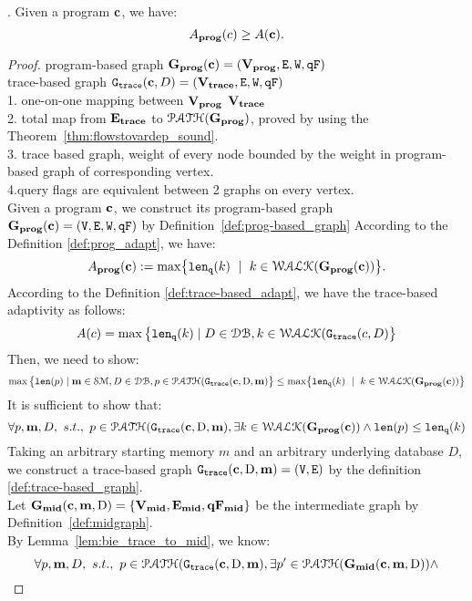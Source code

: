 {
  \begin{thm}.
  Given a program ${\boldsymbol{\mathbf{c}}}$, we have:
  \[
  A_{\bf{prog}}({c}) \geq A({\boldsymbol{\mathbf{c}}}).
  \]
  \end{thm}
}
\begin{proof}
  program-based graph $\mathtt{\bf{G_{prog}}}({\boldsymbol{\mathbf{c}}}) = (\mathtt{\bf{V_{prog}}}, \mathtt{E}, \mathtt{W}, \mathtt{qF})$
  \\
  trace-based graph $\mathtt{G_{trace}}({\boldsymbol{\mathbf{c}}}, D) = (\mathtt{\bf{V_{trace}}}, \mathtt{E}, \mathtt{W}, \mathtt{qF})$ 
  \\
  1. one-on-one mapping between $\mathtt{\bf{V_{prog}}}$ $\mathtt{\bf{V_{trace}}}$
  \\
  2. total map from $\mathtt{\bf{E_{trace}}}$ to $\mathcal{PATH}(\mathtt{\bf{G_{prog}}})$, proved by using the Theorem~\ref{thm:flowstovardep_sound}.
  \\
  3. trace based graph, weight of every node bounded by the weight in program-based graph of corresponding vertex.
  \\
  4.query flags are equivalent between 2 graphs on every vertex.
  \\
Given a program ${\boldsymbol{\mathbf{c}}}$, 
we construct its program-based graph $\mathtt{\bf{G_{prog}}}({\boldsymbol{\mathbf{c}}}) = (\mathtt{V}, \mathtt{E}, \mathtt{W}, \mathtt{qF})$
by Definition~\ref{def:prog-based_graph}
According to the Definition \ref{def:prog_adapt}, we have:
%
\[
  \progA(\ssa{c}) 
  := \max\left\{ \qlen(k)\ \mid \  k\in \walks(\progG(\ssa{c}))\right \}.
\]
%
According to the Definition \ref{def:trace-based_adapt}, we have the trace-based adaptivity as follows:
$$
A(c) = \max \big 
\{ \mathtt{len}_{\tt q}(k) \mid D \in \mathcal{DB} , k \in \mathcal{WALK}(\mathtt{G_{trace}}(c, D) \big \} 
$$
%
Then, we need to show:
\[
\max \big 
\{ \len(p) \mid \ssa{m} \in \mathcal{SM},D \in \dbdom ,p \in \paths(\traceG(\ssa{c}, \text{D}, \ssa{m}) \big \} 
\leq
\max\left\{ \qlen(k) \ \mid \  k\in \walks(\progG(\ssa{c}))\right \}
\]
%
It is sufficient to show that:
\[
  \forall p, {\boldsymbol{\mathbf{m}}}, D, ~ s.t., ~ p \in \mathcal{PATH}(\mathtt{G_{trace}}({\boldsymbol{\mathbf{c}}}, \text{D}, {\boldsymbol{\mathbf{m}}}),
  \exists k \in \mathcal{WALK}(\mathtt{\bf{G_{prog}}}({\boldsymbol{\mathbf{c}}})) \land 
  \mathtt{len}(p) \leq \mathtt{len}_{\tt q}(k)
\]
%
Taking an arbitrary starting memory $m$ and an arbitrary underlying database $D$,
we construct a trace-based graph $\mathtt{G_{trace}}({\boldsymbol{\mathbf{c}}}, \text{D}, {\boldsymbol{\mathbf{m}}}) = (\mathtt{V}, \mathtt{E})$ by the definition \ref{def:trace-based_graph}.
%
\\
%
Let $\mathtt{\bf{G_{mid}}}({\boldsymbol{\mathbf{c}}},{\boldsymbol{\mathbf{m}}},\text{D}) = \{\mathtt{\bf{V_{mid}}}, \mathtt{\bf{E_{mid}}}, \mathtt{\bf{qF_{mid}}}\}$ be the intermediate graph by Definition~\ref{def:midgraph}.
\\
By Lemma~\ref{lem:bie_trace_to_mid}, we know:
\[
  \forall p, {\boldsymbol{\mathbf{m}}}, D, ~ s.t., ~ p \in \mathcal{PATH}(\mathtt{G_{trace}}({\boldsymbol{\mathbf{c}}}, \text{D}, {\boldsymbol{\mathbf{m}}}),
  \exists p' \in \mathcal{PATH}(\mathtt{\bf{G_{mid}}}({\boldsymbol{\mathbf{c}}},{\boldsymbol{\mathbf{m}}},\text{D})) \land 
\]
\end{proof}
